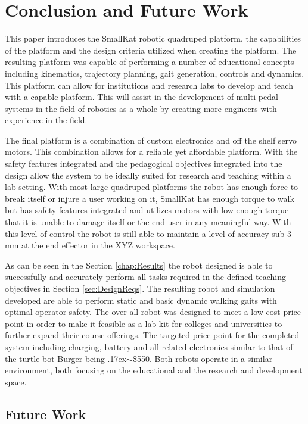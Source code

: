 \documentclass[12pt]{report}
\newcommand{\approximately}{{\raise.17ex\hbox{$\scriptstyle\mathtt{\sim}$}}}
\begin{document}
\chapter{Conclusion and Future Work}

This paper introduces the SmallKat robotic quadruped platform, the capabilities of the platform and the design criteria utilized when creating the platform. The resulting platform was capable of performing a number of educational concepts including kinematics, trajectory planning, gait generation, controls and dynamics. This platform can allow for institutions and research labs to develop and teach with a capable platform. This will assist in the development of multi-pedal systems in the field of robotics as a whole by creating more engineers with experience in the field.

The final platform is a combination of custom electronics and off the shelf servo motors. This combination allows for a reliable yet affordable platform. With the safety features integrated and the pedagogical objectives integrated into the design allow the system to be ideally suited for research and teaching within a lab setting. With most large quadruped platforms the robot has enough force to break itself or injure a user working on it, SmallKat has enough torque to walk but has safety features integrated and utilizes motors with low enough torque that it is unable to damage itself or the end user in any meaningful way. With this level of control the robot is still able to maintain a level of accuracy sub 3 mm at the end effector in the XYZ workspace.

As can be seen in the Section \ref{chap:Results} the robot designed is able to successfully and accurately perform all tasks required in the defined teaching objectives in Section \ref{sec:DesignReqs}. The resulting robot and simulation developed are able to perform static and basic dynamic walking gaits with optimal operator safety. The over all robot was designed to meet a low cost price point in order to make it feasible as a lab kit for colleges and universities to further expand their course offerings. The targeted price point for the completed system including charging, battery and all related electronics similar to that of the turtle bot Burger being \approximately\$550. Both robots operate in a similar environment, both focusing on the educational and the research and development space.

\section{Future Work}

\appendix
\singlespacing



\end{document}
